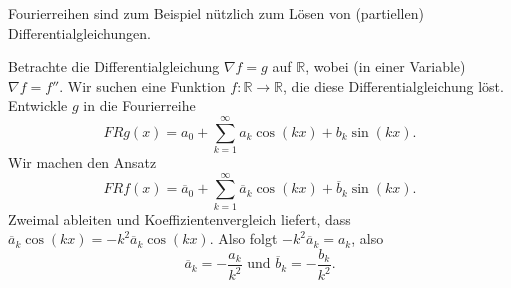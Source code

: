 \documentclass[../main.tex]{subfiles}
\begin{document}
Fourierreihen sind zum Beispiel
nützlich zum Lösen von (partiellen) Differentialgleichungen.

\begin{example}
  Betrachte die Differentialgleichung $\nabla f = g$ auf $\mathbb{R}$,
  wobei (in einer Variable) $\nabla f = f''$.
  Wir suchen eine Funktion $f\colon \mathbb{R} \to \mathbb{R}$, die diese
  Differentialgleichung löst.
  Entwickle $g$ in die Fourierreihe
  \[
    FRg(x) = a_0 + \sum_{k=1}^{\infty} a_k \cos(kx) + b_k \sin(kx).
  \]
  Wir machen den Ansatz
  \[
    FRf(x) = \overline a_0 +
    \sum_{k=1}^{\infty} \overline a_k \cos(kx) + \overline b_k \sin(kx).
  \]
  Zweimal ableiten und Koeffizientenvergleich liefert, dass
  \(
    \overline a_k \cos(kx) = - k^2 \overline a_k \cos(kx).
  \)
  Also folgt
  \(
    -k^2 \overline a_k = a_k
  \),
  also
  \[
    \overline a_k = - \frac{a_k}{k^2} \text{ und } \overline b_k = - \frac{b_k}{k^2}.
  \]
\end{example}
\end{document}
